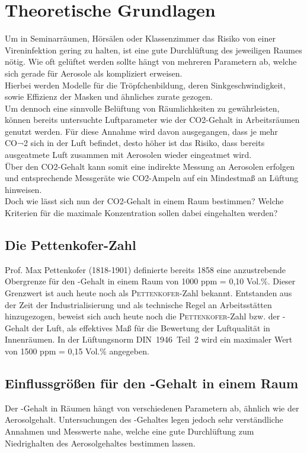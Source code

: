 \section{Theoretische Grundlagen}
Um in Seminarräumen, Hörsälen oder Klassenzimmer das Risiko von einer Vireninfektion gering zu halten, ist eine gute Durchlüftung des jeweiligen Raumes nötig. Wie oft gelüftet werden sollte hängt von mehreren Parametern ab, welche sich gerade für Aerosole als kompliziert erweisen. \\
Hierbei werden Modelle für die Tröpfchenbildung, deren Sinkgeschwindigkeit, sowie Effizienz der Masken und ähnliches zurate gezogen. \\
Um dennoch eine sinnvolle Belüftung von Räumlichkeiten zu gewährleisten, können bereits untersuchte Luftparameter wie der CO2-Gehalt in Arbeitsräumen genutzt werden. Für diese Annahme wird davon ausgegangen, dass je mehr CO¬2 sich in der Luft befindet, desto höher ist das Risiko, dass bereits ausgeatmete Luft zusammen mit Aerosolen wieder eingeatmet wird. \\
Über den CO2-Gehalt kann somit eine indirekte Messung an Aerosolen erfolgen und entsprechende Messgeräte wie CO2-Ampeln auf ein Mindestmaß an Lüftung hinweisen.\\
Doch wie lässt sich nun der CO2-Gehalt in einem Raum bestimmen? Welche Kriterien für die maximale Konzentration sollen dabei eingehalten werden? \cite{Hartmann.2020,Simmank.15.08.2020,bghm2020}

\subsection{Die Pettenkofer-Zahl}
Prof. Max Pettenkofer (1818-1901) definierte bereits 1858 eine anzustrebende Obergrenze für den -Gehalt in einem Raum von 1000 ppm = 0,10 Vol.\%. Dieser Grenzwert ist auch heute noch als \textsc{Pettenkofer}-Zahl bekannt.
Entstanden aus der Zeit der Industrialisierung und als technische Regel an Arbeitsstätten hinzugezogen, beweist sich auch heute noch die \textsc{Pettenkofer}-Zahl bzw. der -Gehalt der Luft, als effektives Maß für die Bewertung der Luftqualität in Innenräumen. 
In der Lüftungsnorm \mbox{DIN 1946 Teil 2} wird ein maximaler Wert von 1500 ppm = 0,15 Vol.\% angegeben.

\subsection{Einflussgrößen für den -Gehalt in einem Raum}
Der -Gehalt in Räumen hängt von verschiedenen Parametern ab, ähnlich wie der Aerosolgehalt. Untersuchungen des -Gehaltes legen jedoch sehr verständliche Annahmen und Messwerte nahe, welche eine gute Durchlüftung zum Niedrighalten des Aerosolgehaltes bestimmen lassen.

